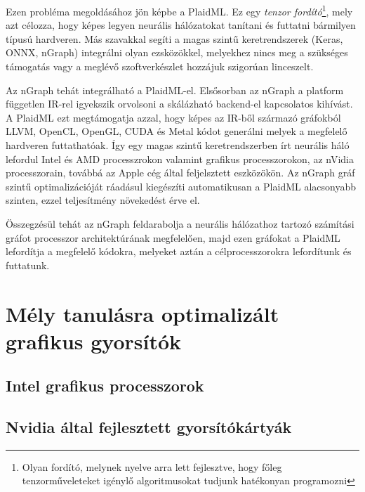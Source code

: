 Ezen probléma megoldásához jön képbe a PlaidML. Ez egy \emph{tenzor fordító}\footnote{Olyan fordító, melynek nyelve arra lett fejlesztve, hogy főleg tenzorműveleteket igénylő algoritmusokat tudjunk hatékonyan programozni}, mely azt célozza, hogy képes legyen neurális hálózatokat tanítani és futtatni bármilyen típusú hardveren. Más szavakkal segíti a magas szintű keretrendszerek (Keras, ONNX, nGraph) integrálni olyan ezsközökkel, melyekhez nincs meg a szükséges támogatás vagy a meglévő szoftverkészlet hozzájuk szigorúan linceszelt.\cite{github:PlaidML}\cite{web:PlaidML}

Az nGraph tehát integrálható a PlaidML-el. Elsősorban az nGraph a platform független IR-rel igyekszik orvolsoni a skálázható backend-el kapcsolatos kihívást. A PlaidML ezt megtámogatja azzal, hogy képes az IR-ből származó gráfokból LLVM, OpenCL, OpenGL, CUDA és Metal kódot generálni melyek a megfelelő hardveren futtathatóak. Így egy magas szintű keretrendszerben írt neurális háló lefordul Intel és AMD processzrokon valamint grafikus processzorokon, az nVidia processzorain, továbbá az Apple cég által feljelsztett eszközökön. Az nGraph gráf szintű optimalizációját ráadásul kiegészíti automatikusan a PlaidML alacsonyabb szinten, ezzel teljesítmény növekedést érve el.

Összegzésül tehát az nGraph feldarabolja a neurális hálózathoz tartozó számítási gráfot processzor architektúrának megfelelően, majd ezen gráfokat a PlaidML lefordítja a megfelelő kódokra, melyeket aztán a célprocesszorokra lefordítunk és futtatunk.

\section{Mély tanulásra optimalizált grafikus gyorsítók}
\subsection{Intel grafikus processzorok}

\subsection{Nvidia által fejlesztett gyorsítókártyák }

